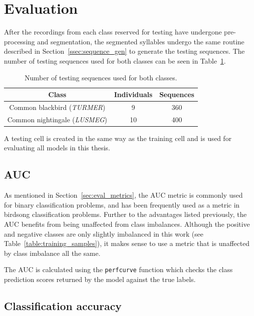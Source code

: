 \section{Evaluation}

After the recordings from each class reserved for testing have undergone
pre-processing and segmentation, the segmented syllables undergo the same
routine described in Section~\ref{ssec:sequence_gen} to generate the testing
sequences. The number of testing sequences used for both classes can be seen in
Table~\ref{table:testing_samples}.

\begin{table}[ht]
\begin{center}
\begin{tabular}{c c c}
\toprule
Class & Individuals & Sequences \\ [0.5ex]
\midrule
Common blackbird (\textit{TURMER}) & 9 & 360 \\
Common nightingale (\textit{LUSMEG}) & 10 & 400 \\
\bottomrule
\end{tabular}
\caption{Number of testing sequences used for both
classes.}\label{table:testing_samples}
\end{center}
\end{table}

A testing cell is created in the same way as the training cell and is used for
evaluating all models in this thesis.

\subsection{AUC}

As mentioned in Section~\ref{sec:eval_metrics}, the AUC metric is commonly used
for binary classification problems, and has been frequently used as a metric in
birdsong classification problems. Further to the advantages listed previously,
the AUC benefits from being unaffected from class imbalances. Although the
positive and negative classes are only slightly imbalanced in this work (see
Table~\ref{table:training_samples}), it makes sense to use a metric that is
unaffected by class imbalance all the same.

The AUC is calculated using the \texttt{perfcurve} function which checks the
class prediction scores returned by the model against the true labels.

\subsection{Classification accuracy}

